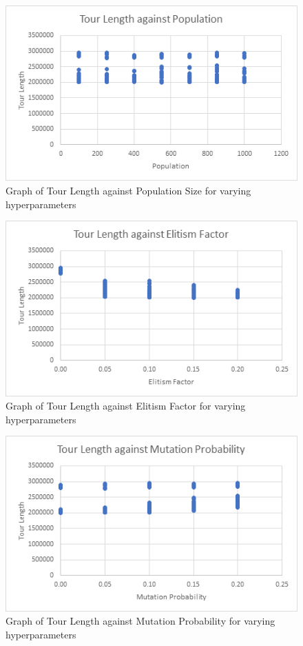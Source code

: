 \documentclass[sigconf]{acmart}
\begin{document}
\begin{figure}[h]
  \centering
  \includegraphics[width=\linewidth=]{genetic_pop_graph.png}
  \caption{Graph of Tour Length against Population Size for varying hyperparameters}
\end{figure}
\begin{figure}[h]
  \centering
  \includegraphics[width=\linewidth]{genetic_elite_graph.png}
  \caption{Graph of Tour Length against Elitism Factor for varying hyperparameters}
\end{figure}
\begin{figure}[h]
  \centering
  \includegraphics[width=\linewidth]{genetic_mutate_graph.png}
  \caption{Graph of Tour Length against Mutation Probability for varying hyperparameters}
\end{figure}
\end{document}
